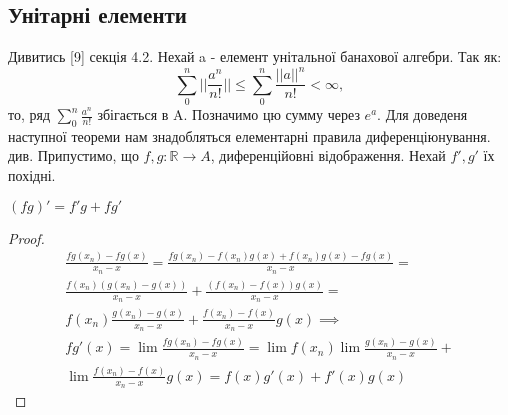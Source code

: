 \subsection{Унітарні елементи}
Дивитись [9] секція 4.2.
Нехай a - елемент унітальної банахової алгебри.
Так як:
\begin{equation*}
    \sum_0^n || \frac{a^n}{n!} || \leq \sum_0^n \frac{||a||^n}{n!} < \infty,
\end{equation*}
то, ряд $\sum_0^n \frac{a^n}{n!}$ збігається в A. Позначимо цю сумму через $e^a$.
Для доведеня наступної теореми нам знадобляться елементарні правила диференціюнування. {див. }
Припустимо, що $f,g: \mathbb{R} \rightarrow A$, диференційовні відображення.
Нехай $f', g'$ їх похідні.
\begin{lemma}
    $(fg)' = f'g + fg'$
    \begin{proof}
        \begin{align*}
            \frac{fg(x_n) - fg(x)}{x_n - x} = \frac{fg(x_n) - f(x_n)g(x) + f(x_n)g(x) - fg(x)}{x_n - x} = \\
            \frac{f(x_n)(g(x_n) - g(x))}{x_n-x} + \frac{(f(x_n) - f(x))g(x)}{x_n - x} = \\
            f(x_n) \frac{g(x_n) - g(x)}{x_n - x} + \frac{f(x_n) - f(x)}{x_n-x} g(x) \implies \\
            fg'(x) = \lim \frac{fg(x_n)-fg(x)}{x_n - x} = \lim f(x_n) \lim \frac{g(x_n) - g(x)}{x_n - x} + \\
            \lim \frac{f(x_n) - f(x)}{x_n-x}  g(x) = f(x)g'(x) + f'(x)g(x)
        \end{align*}
    \end{proof}
\end{lemma}

